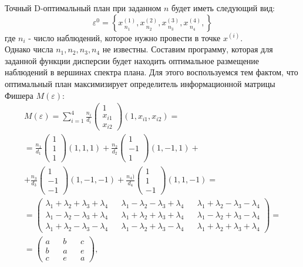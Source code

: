 Точный D-оптимальный план при заданном $n$ будет иметь следующий вид:
\begin{equation}
\varepsilon^{0} = \left \{ 
\underset{n_1} {x^{(1)}},
\underset{n_2} {x^{(2)}},
\underset{n_3} {x^{(3)}},
\underset{n_4} {x^{(4)}},
\right \}
\end{equation}
где $n_i$ - число наблюдений, которое нужно провести в точке $x^{(i)}$.\\
Однако числа $n_1, n_2, n_3, n_4$ не известны. Составим программу, которая для заданной функции дисперсии будет находить оптимальное размещение наблюдений в вершинах спектра плана.
Для этого воспользуемся тем фактом, что оптимальный план максимизирует определитель информационной матрицы Фишера $M(\varepsilon)$:
\begin{multline*} 
M(\varepsilon) = \sum_{i = 1}^{4} \frac{n_i} {d_i} 
\begin{pmatrix}1 \\ x_{i1} \\ x_{i2} \end{pmatrix}
(1, x_{i1}, x_{i2}) = \\
= \frac {n_1} {d_1} \begin{pmatrix}1 \\ 1 \\ 1\end{pmatrix} (1, 1, 1) + 
\frac {n_2} {d_2} \begin{pmatrix}1 \\ -1 \\ 1\end{pmatrix} (1, -1, 1) + \\
+ \frac {n_3} {d_3} \begin{pmatrix}1 \\ -1 \\ -1\end{pmatrix} (1, -1, -1) +
\frac {n_4)} {d_4} \begin{pmatrix} 1 \\ 1 \\ -1\end{pmatrix} (1, 1, -1) = \\
= \begin{pmatrix}
\lambda_1 + \lambda_2 + \lambda_3 + \lambda_4 &&
\lambda_1 - \lambda_2 - \lambda_3 + \lambda_4 &&
\lambda_1 + \lambda_2 - \lambda_3 - \lambda_4
\\
\lambda_1 - \lambda_2 - \lambda_3 + \lambda_4 &&
\lambda_1 + \lambda_2 + \lambda_3 + \lambda_4 &&
\lambda_1 - \lambda_2 + \lambda_3 - \lambda_4
\\
\lambda_1 + \lambda_2 - \lambda_3 - \lambda_4 &&
\lambda_1 - \lambda_2 + \lambda_3 - \lambda_4 &&
\lambda_1 + \lambda_2 + \lambda_3 + \lambda_4
\end{pmatrix} = \\
= \begin{pmatrix}
a && b && c \\
b && a && e \\
c && e && a
\end{pmatrix},
\end{multline*}

